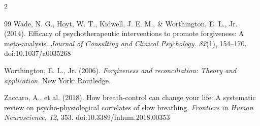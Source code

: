 \documentclass[10pt]{article}
\theoremstyle{definition}
\theoremstyle{remark}
\begin{document}
\begin{multicols}{2}
\begin{thebibliography}{99}
Wade, N. G., Hoyt, W. T., Kidwell, J. E. M., \& Worthington, E. L., Jr. (2014). Efficacy of psychotherapeutic interventions to promote forgiveness: A meta-analysis. \emph{Journal of Consulting and Clinical Psychology, 82}(1), 154--170. doi:10.1037/a0035268

Worthington, E. L., Jr. (2006). \emph{Forgiveness and reconciliation: Theory and application.} New York: Routledge.

Zaccaro, A., et al. (2018). How breath-control can change your life: A systematic review on psycho-physiological correlates of slow breathing. \emph{Frontiers in Human Neuroscience, 12}, 353. doi:10.3389/fnhum.2018.00353

\end{thebibliography}
\end{multicols}
\end{document}
